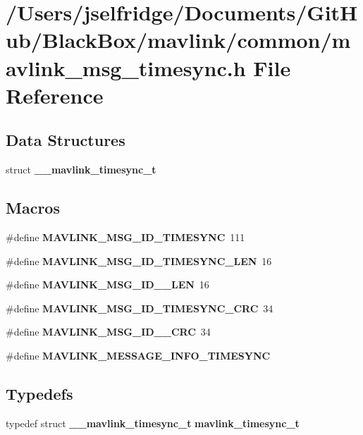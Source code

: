 \section{/\+Users/jselfridge/\+Documents/\+Git\+Hub/\+Black\+Box/mavlink/common/mavlink\+\_\+msg\+\_\+timesync.h File Reference}
\label{mavlink__msg__timesync_8h}
\subsection*{Data Structures}
\begin{DoxyCompactItemize}
\item 
struct \textbf{ \+\_\+\+\_\+mavlink\+\_\+timesync\+\_\+t}
\end{DoxyCompactItemize}
\subsection*{Macros}
\begin{DoxyCompactItemize}
\item 
\#define \textbf{ M\+A\+V\+L\+I\+N\+K\+\_\+\+M\+S\+G\+\_\+\+I\+D\+\_\+\+T\+I\+M\+E\+S\+Y\+NC}~111
\item 
\#define \textbf{ M\+A\+V\+L\+I\+N\+K\+\_\+\+M\+S\+G\+\_\+\+I\+D\+\_\+\+T\+I\+M\+E\+S\+Y\+N\+C\+\_\+\+L\+EN}~16
\item 
\#define \textbf{ M\+A\+V\+L\+I\+N\+K\+\_\+\+M\+S\+G\+\_\+\+I\+D\+\_\+\_\+\+L\+EN}~16
\item 
\#define \textbf{ M\+A\+V\+L\+I\+N\+K\+\_\+\+M\+S\+G\+\_\+\+I\+D\+\_\+\+T\+I\+M\+E\+S\+Y\+N\+C\+\_\+\+C\+RC}~34
\item 
\#define \textbf{ M\+A\+V\+L\+I\+N\+K\+\_\+\+M\+S\+G\+\_\+\+I\+D\+\_\+\_\+\+C\+RC}~34
\item 
\#define \textbf{ M\+A\+V\+L\+I\+N\+K\+\_\+\+M\+E\+S\+S\+A\+G\+E\+\_\+\+I\+N\+F\+O\+\_\+\+T\+I\+M\+E\+S\+Y\+NC}
\end{DoxyCompactItemize}
\subsection*{Typedefs}
\begin{DoxyCompactItemize}
\item 
typedef struct \textbf{ \+\_\+\+\_\+mavlink\+\_\+timesync\+\_\+t} \textbf{ mavlink\+\_\+timesync\+\_\+t}
\end{DoxyCompactItemize}


